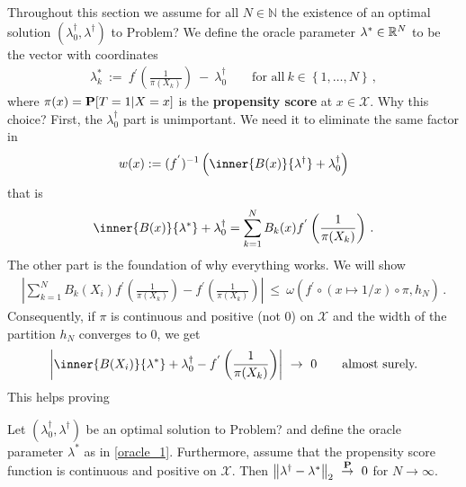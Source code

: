 Throughout this section we assume for all $N\in\mathbb{N}$ the existence of an 
optimal solution 
$(\lambda_0^\dagger,\lambda^\dagger)$
to Problem?
We define the oracle parameter $\lambda^*\in\R^N$ to be the vector with coordinates
\begin{gather}
  \label{oracle_1}
  \lambda^*_k
  \ 
  :=
  \ 
  f^{'}
  \left( 
    \frac{1}{\pi(X_k)}
  \right)
  \ 
  -
  \ 
  \lambda^\dagger_0
  \qquad
  \text{for all}\ 
  k\in \left\{ 1,\ldots,N \right\}
  \,,
\end{gather}
where $\pi(x)=\P[T=1|X=x]$ is the \textbf{propensity score} at $x\in\mathcal{X}$. Why this choice? First, the $\lambda_0^\dagger$ part is unimportant. We need it to eliminate the same factor in
\begin{gather}
  w(x):=
  (
  f^{'}
  )^{-1}
  \left( \inner{B(x)}{\lambda^\dagger}+\lambda_0^\dagger \right)
\end{gather}
that is 
\begin{gather}
  \inner{B(x)}{\lambda^*}+\lambda_0^\dagger 
  =
\sum_{k=1}^{N} 
B_k(x)
  f^{'}
  \left( 
    \frac{1}{\pi(X_k)}
  \right)
  \,.
\end{gather}
The other part is the foundation of why everything works.
We will show
\begin{gather}
\left| 
\sum_{k=1}^{N} 
B_k(X_i)
  f^{'}
  \left( 
    \frac{1}{\pi(X_k)}
  \right)
  -
  f^{'}
  \left( 
    \frac{1}{\pi(X_k)}
  \right)
\right|
\ 
\le
\ 
      \omega
      \left( f^{'}\circ (x\mapsto1/x)\circ \pi,h_N \right)
      \,.
\end{gather}
Consequently, if $\pi$ is continuous and positive (not 0) on $\mathcal{X}$ and the width of the partition $h_N$ converges to 0, we get 
\begin{gather}
 \left| 
  \inner{B(X_i)}{\lambda^*}+\lambda_0^\dagger 
  -
  f^{'}
  \left( 
    \frac{1}{\pi(X_k)}
  \right)
 \right| 
 \
 \to
 \ 
 0
 \qquad
 \text{almost surely.}
\end{gather}
This helps proving 
\begin{ftheorem}
  \label{bw:cd:th}
  Let 
$(\lambda_0^\dagger,\lambda^\dagger)$
be an optimal solution 
to Problem?
and define the oracle parameter $\lambda^*$ as in \eqref{oracle_1}.
Furthermore, assume that the propensity score function is continuous and positive on $\mathcal{X}$.
Then 
$
    \norm{
      \lambda^\dagger
      -
      \lambda^*
    }_2
    \ 
    \overset{\P}{\to}
    \ 
    0
$
for $N\to\infty$.
\end{ftheorem}
